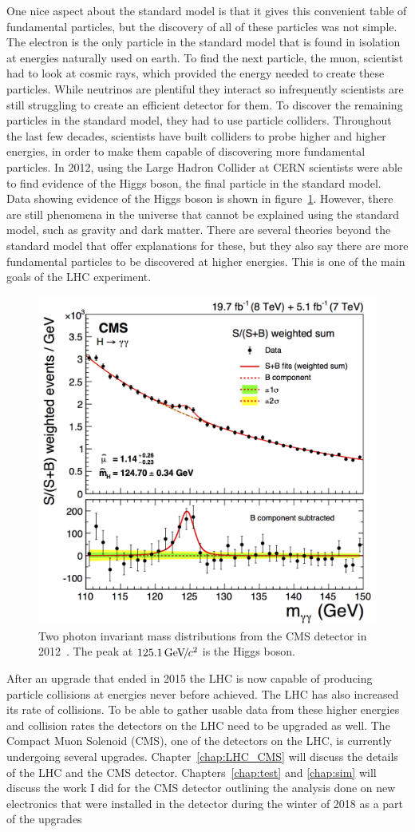 One nice aspect about the standard model is that it gives this convenient table of fundamental particles, but the discovery of all of these particles was not simple. The electron is the only particle in the standard model that is found in isolation at energies naturally used on earth. To find the next particle, the muon, scientist had to look at cosmic rays, which provided the energy needed to create these particles. While neutrinos are plentiful they interact so infrequently scientists are still struggling to create an efficient detector for them. To discover the remaining particles in the standard model, they had to use particle colliders. Throughout the last few decades, scientists have built colliders to probe higher and higher energies, in order to make them capable of discovering more fundamental particles. In 2012, using the Large Hadron Collider at CERN scientists were able to find evidence of the Higgs boson, the final particle in the standard model. Data showing evidence of the Higgs boson is shown in figure~\ref{fig:higgs}. However, there are still phenomena in the universe that cannot be explained using the standard model, such as gravity and dark matter. There are several theories beyond the standard model that offer explanations for these, but they also say there are more fundamental particles to be discovered at higher energies. This is one of the main goals of the LHC experiment. 

\begin{figure}
\centering
\includegraphics[width=0.6\linewidth]{Figures/higgsmeasurement.png}
\caption{Two photon invariant mass distributions from the CMS detector in 2012~\cite{CMS_Higgs_Discovery}. The peak at $125.1{\,\text{Ge\hspace{-.08em}V\hspace{-0.16em}/\hspace{-0.08em}}c^\text{2}}$ is the Higgs boson.}
\label{fig:higgs}
\end{figure} 


After an upgrade that ended in 2015 the LHC is now capable of producing particle collisions at energies never before achieved. The LHC has also increased its rate of collisions. To be able to gather usable data from these higher energies and collision rates the detectors on the LHC need to be upgraded as well. The Compact Muon Solenoid (CMS), one of the detectors on the LHC, is currently undergoing several upgrades. Chapter~\ref{chap:LHC_CMS} will discuss the details of the LHC and the CMS detector. Chapters~\ref{chap:test} and \ref{chap:sim} will discuss the work I did for the CMS detector outlining the analysis done on new electronics that were installed in the detector during the winter of 2018 as a part of the upgrades

